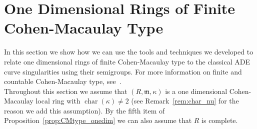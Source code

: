 \documentclass{article}
\newtheorem{definition}[theorem]{Definition}
\newtheorem{proposition}[theorem]{Proposition}
\newtheorem{remark}[theorem]{Remark}
\DeclareMathOperator{\chara}{char}
\DeclareMathOperator{\edim}{edim}
\DeclareMathOperator{\mult}{mult}
\numberwithin{theorem}{section}
\begin{document}





    

\section{One Dimensional Rings of Finite Cohen-Macaulay Type}\label{sec:FCMT1}

In this section we show how we can use the tools and techniques we developed to relate one dimensional rings of finite Cohen-Macaulay type to the classical ADE curve singularities using their semigroups. For more information on finite and countable Cohen-Macaulay type, see~\cite{svoray2025ade, yoshino1990maximal, leuschke2012cohen}. \\

Throughout this section we assume that $(R, \mathfrak{m}, \kappa)$ is a one dimensional Cohen-Macaulay local ring with $\chara(\kappa) \neq 2$ (see Remark~\ref{rem:char_nu} for the reason we add this assumption). By the fifth item of Proposition~\ref{prop:CMtype_onedim} we can also assume that $R$ is complete. 
\end{document}
